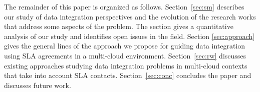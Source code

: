 The remainder of this paper is organized as follows. 
Section~\ref{sec:sm} describes our study of  data integration perspectives and the evolution of the research works that address some aspects of the problem. The section gives a quantitative analysis of our study and identifies open issues in the field. Section \ref{sec:approach} gives the general lines of the approach we propose for guiding data integration using SLA agreements in a multi-cloud environment.  Section~\ref{sec:rw} discusses existing approaches studying data integration problems in multi-cloud contexts that take into account SLA contacts.
Section~\ref{sec:conc} concludes the paper and discusses future work. 


